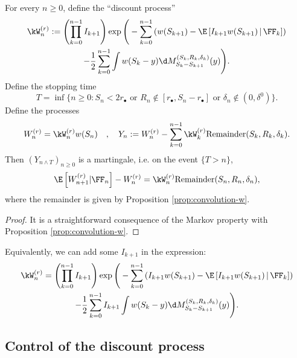 \documentclass[10pt,a4paper]{article}
\begin{document}
\begin{proposition}\label{prop:almost-martingale}
For every $n\geq 0$, define the ``discount process'' 
\begin{multline}\label{eq:def-Z}
\kW^{(r)}_n := \left(\prod_{k=0}^{n-1} I_{k+1}\right) \exp\Bigg(- \sum_{k=0}^{n-1} \left( w(S_{k+1}) - \E\left[ I_{k+1} w(S_{k+1}) \, | \, \FF_k \right] \right) \\
- \frac 12 \sum_{k=0}^{n-1} \int w(S_k-y) \d M^{(S_k,R_k,\delta_k)}_{S_k-S_{k+1}}(y) \Bigg) . 
\end{multline}
Define the stopping time 
\[ T = \inf\{n\geq 0 : S_n < 2r_\bullet \text{ or } R_n \notin [r_\bullet, S_n - r_\bullet] \text{ or } \delta_n \notin (0,\delta^0) \} . \]
Define the processes 
\begin{equation}
W^{(r)}_n = \kW^{(r)}_n w(S_n) \quad , \quad Y_n := W^{(r)}_n - \sum_{k=0}^{n-1} \kW^{(r)}_k  \mathrm{Remainder}(S_k, R_k, \delta_k) .
\end{equation}
Then $(Y_{n\wedge T})_{n\geq 0}$ is a martingale, i.e. on the event $\{T > n\}$, 
\begin{equation}\label{eq:almost-mg-ppty}
\E\left[ W^{(r)}_{n+1} | \FF_n\right]  -  W^{(r)}_n = \kW^{(r)}_n \mathrm{Remainder}(S_n, R_n, \delta_n) ,
\end{equation}
where the remainder is given by Proposition \ref{prop:convolution-w}. 
\end{proposition}

\begin{proof}
It is a straightforward consequence of the Markov property with Proposition \ref{prop:convolution-w}. 
\end{proof}

Equivalently, we can add some $I_{k+1}$ in the expression: 
\begin{multline*}
\kW^{(r)}_n = \left(\prod_{k=0}^{n-1} I_{k+1}\right) \exp\Bigg(- \sum_{k=0}^{n-1} \left( I_{k+1} w(S_{k+1}) - \E\left[ I_{k+1} w(S_{k+1}) \, | \, \FF_k \right] \right) \\
- \frac 12 \sum_{k=0}^{n-1} I_{k+1} \int w(S_k-y) \d M^{(S_k,R_k,\delta_k)}_{S_k-S_{k+1}}(y) \Bigg) . 
\end{multline*}





\subsection{Control of the discount process}
\end{document}
